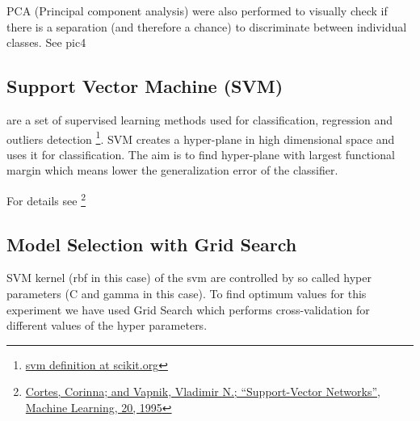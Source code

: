 \documentclass[11pt]{article}
\begin{document}
   PCA (Principal component analysis) were also performed to visually
   check if there is a separation (and therefore a chance) to
   discriminate between individual classes. See pic4 

\subsection{Support Vector Machine (SVM)}
\label{sec-1.3}

   are a set of supervised learning methods used for classification,
   regression and outliers detection \footnote{\href{http://scikit-learn.org/stable/modules/svm.html}{svm definition at scikit.org} }.  SVM creates a hyper-plane in
   high dimensional space and uses it for classification. The aim is
   to find hyper-plane with largest functional margin which means lower
   the generalization error of the classifier.

   For details see \footnote{\href{http://www.springerlink.com/content/k238jx04hm87j80g/}{Cortes, Corinna; and Vapnik, Vladimir N.; ``Support-Vector Networks'', Machine Learning, 20, 1995} }

\subsection{Model Selection with Grid Search}
\label{sec-1.4}

   SVM kernel (rbf in this case) of the svm are controlled by so
   called hyper parameters (C and gamma in this case). To find optimum
   values for this experiment we have used Grid Search which
   performs cross-validation for different values of the hyper
   parameters.
\end{document}
